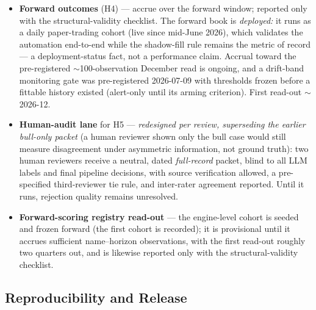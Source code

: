 \documentclass[11pt]{article}
\begin{document}
\begin{itemize}
  \item \textbf{Forward outcomes} (H4) --- accrue over the forward window;
    reported only with the structural-validity checklist. The forward book is \emph{deployed:} it runs as
    a daily paper-trading cohort (live since mid-June 2026), which validates the automation end-to-end
    while the shadow-fill rule remains the metric of record --- a deployment-status fact, not a
    performance claim. Accrual toward the pre-registered $\sim$100-observation December read is
    ongoing, and a drift-band monitoring gate was pre-registered 2026-07-09 with thresholds frozen
    before a fittable history existed (alert-only until its arming criterion). First read-out
    $\sim$2026-12.
  \item \textbf{Human-audit lane} for H5 --- \emph{redesigned per review, superseding the earlier
    bull-only packet} (a human reviewer shown only the bull case would still measure disagreement
    under asymmetric information, not ground truth): two human reviewers receive a neutral, dated
    \emph{full-record} packet, blind to all LLM labels and final pipeline decisions, with source
    verification allowed, a pre-specified third-reviewer tie rule, and inter-rater agreement
    reported. Until it runs, rejection quality remains unresolved.
  \item \textbf{Forward-scoring registry read-out} --- the engine-level cohort is
    seeded and frozen forward (the first cohort is recorded); it is provisional until it
    accrues sufficient name--horizon observations, with the first read-out roughly two
    quarters out, and is likewise reported only with the structural-validity checklist.
\end{itemize}

\subsection{Reproducibility and Release}
\end{document}
